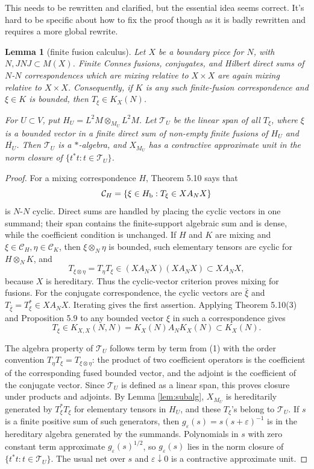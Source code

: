 \documentclass[12pt]{article}
\newtheorem{lemma}{Lemma}
\newcommand{\cT}{\mathcal T}
\newcommand{\review}[1]{\begin{reviewbox}#1\end{reviewbox}}
\begin{document}
\review{This needs to be rewritten and clarified, but the essential idea seems correct. It's hard to be specific about how to fix the proof though as it is badly rewritten and requires a more global rewrite.}

\begin{lemma}[finite fusion calculus]\label{lem:fusion}
Let \(X\) be a boundary piece for \(N\), with \(N,JNJ\subset M(X)\).  Finite
Connes fusions, conjugates, and Hilbert direct sums of \(N\)-\(N\)
correspondences which are mixing relative to \(X\times X\) are again mixing
relative to \(X\times X\).  Consequently, if \(K\) is any such finite-fusion
correspondence and \(\xi\in K\) is bounded, then \(T_\xi\in K_X(N)\).

For \(U\subset V\), put \(H_U=L^2M\otimes_{M_U}L^2M\).  Let \(\cT_U\) be the
linear span of all \(T_\xi\), where \(\xi\) is a bounded vector in a finite
direct sum of non-empty finite fusions of \(H_U\) and \(\overline{H_U}\).
Then \(\cT_U\) is a \(*\)-algebra, and \(X_{M_U}\) has a contractive
approximate unit in the norm closure of \(\{t^*t:t\in\cT_U\}\).
\end{lemma}

\begin{proof}
For a mixing correspondence \(H\), Theorem 5.10 says that
\[
  \mathcal C_H=\{\xi\in H_{\rm b}: T_\xi\in X A_N X\}
\]
is \(N\)-\(N\) cyclic.  Direct sums are handled by placing the cyclic vectors
in one summand; their span contains the finite-support algebraic sum and is
dense, while the coefficient condition is unchanged.  If \(H\) and \(K\) are
mixing and \(\xi\in\mathcal C_H,\eta\in\mathcal C_K\), then \(\xi\otimes_N\eta\)
is bounded, such elementary tensors are cyclic for \(H\otimes_NK\), and
\[
        T_{\xi\otimes\eta}=T_\eta T_\xi\in (X A_N X)(X A_N X)\subset X A_N X,
\]
because \(X\) is hereditary.  Thus the cyclic-vector criterion proves mixing
for fusions.  For the conjugate correspondence, the cyclic vectors are
\(\bar\xi\) and \(T_{\bar\xi}=T_\xi^*\in X A_NX\).  Iterating gives the first
assertion.  Applying Theorem 5.10(3) and Proposition 5.9 to any bounded vector
\(\xi\) in such a correspondence gives
\[
        T_\xi\in K_{X,X}(N,N)=K_X(N)A_NK_X(N)\subset K_X(N).
\]

The algebra property of \(\cT_U\) follows term by term from (1) with the order
convention \(T_\eta T_\xi=T_{\xi\otimes\eta}\): the product of two coefficient
operators is the coefficient of the corresponding fused bounded vector, and the
adjoint is the coefficient of the conjugate vector.  Since \(\cT_U\) is defined
as a linear span, this proves closure under products and adjoints.  By Lemma
\ref{lem:subalg}, \(X_{M_U}\) is hereditarily generated
by \(T_\xi^*T_\xi\) for elementary tensors in \(H_U\), and these \(T_\xi\)'s
belong to \(\cT_U\).  If \(s\) is a finite positive sum of such generators,
then \(g_\varepsilon(s)=s(s+\varepsilon)^{-1}\) is in the hereditary algebra
generated by the summands.  Polynomials in \(s\) with zero constant term
approximate \(g_\varepsilon(s)^{1/2}\), so \(g_\varepsilon(s)\) lies in the
norm closure of \(\{t^*t:t\in\cT_U\}\).  The usual net over \(s\) and
\(\varepsilon\downarrow0\) is a contractive approximate unit.
\end{proof}
\end{document}
